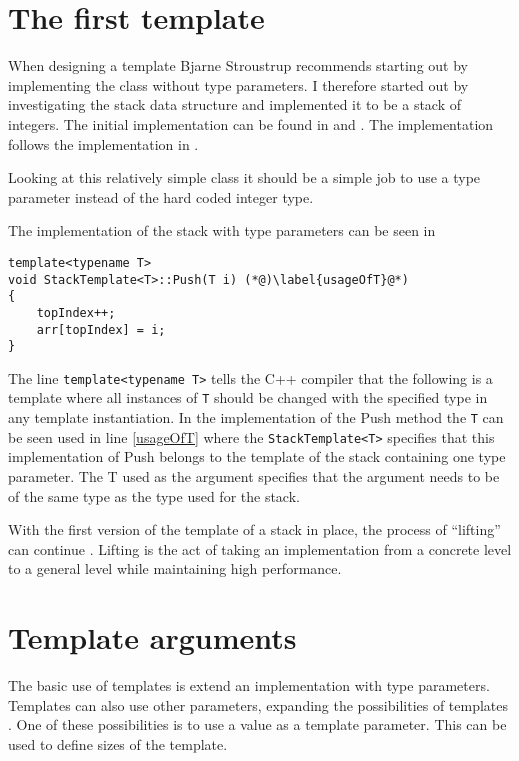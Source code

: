 \section{The first template}
When designing a template Bjarne Stroustrup recommends starting out by implementing the class without type parameters\cite[p.~670]{stroustrup2013c++}. 
I therefore started out by investigating the stack data structure and implemented it to be a stack of integers.
The initial implementation can be found in  and .
The implementation follows the implementation in \citet[232]{algo}.

Looking at this relatively simple class it should be a simple job to use a type parameter instead of the hard coded integer type.

The implementation of the stack with type parameters can be seen in 

\begin{lstlisting}
template<typename T>
void StackTemplate<T>::Push(T i) (*@)\label{usageOfT}@*)
{
	topIndex++;
	arr[topIndex] = i;
}
\end{lstlisting}

The line \lstinline|template<typename T>| tells the C++ compiler that the following is a template where all instances of \texttt{T} should be changed with the specified type in any template instantiation.
In the implementation of the Push method the \texttt{T} can be seen used in line \ref{usageOfT} where the \lstinline|StackTemplate<T>| specifies that this implementation of Push belongs to the template of the stack containing one type parameter.
The T used as the argument specifies that the argument needs to be of the same type as the type used for the stack. 

With the first version of the template of a stack in place, the process of ``lifting'' can continue . 
Lifting is the act of taking an implementation from a concrete level to a general level while maintaining high performance\cite[p.~700]{stroustrup2013c++}.

\section{Template arguments}
The basic use of templates is extend an implementation with type parameters.
Templates can also use other parameters, expanding the possibilities of templates \cite[p.~722]{stroustrup2013c++}.
One of these possibilities is to use a value as a template parameter.
This can be used to define sizes of the template. \cite[p.~724]{stroustrup2013c++}

